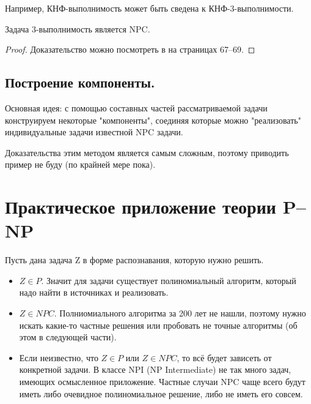 Например, КНФ-выполнимость может быть сведена к КНФ-3-выполнимости.
\begin{theorem}
Задача 3-выполнимость является NPC.
\end{theorem}
\begin{proof}
Доказательство можно посмотреть в \cite{Geri} на страницах 67--69.
\end{proof}

\subsection*{Построение компоненты.}

Основная идея: с помощью составных частей рассматриваемой задачи конструируем некоторые "компоненты"{}, соединяя которые можно "реализовать"{} индивидуальные задачи известной NPC задачи. 

Доказательства этим методом является самым сложным, поэтому приводить пример не буду (по крайней мере пока).

\section{Практическое приложение теории P--NP}

Пусть дана задача Z в форме распознавания, которую нужно решить. 
\begin{itemize}
	\item $Z\in P$. Значит для задачи существует полиномиальный алгоритм,
		который надо найти в источниках и реализовать.
	\item  $Z \in NPC$. Полниомиального алгоритма за 200 лет не нашли,
		поэтому нужно искать какие-то частные решения или пробовать не
		точные алгоритмы (об этом в следующей части).
	\item Если неизвестно, что  $Z\in P$ или  $Z \in NPC$, то всё будет
		зависеть от конкретной задачи. В классе NPI (NP Intermediate) не
		так много задач, имеющих осмысленное приложение. Частные случаи
		NPC чаще всего будут иметь либо очевидное полиномиальное
		решение, либо не иметь его совсем.
\end{itemize}













